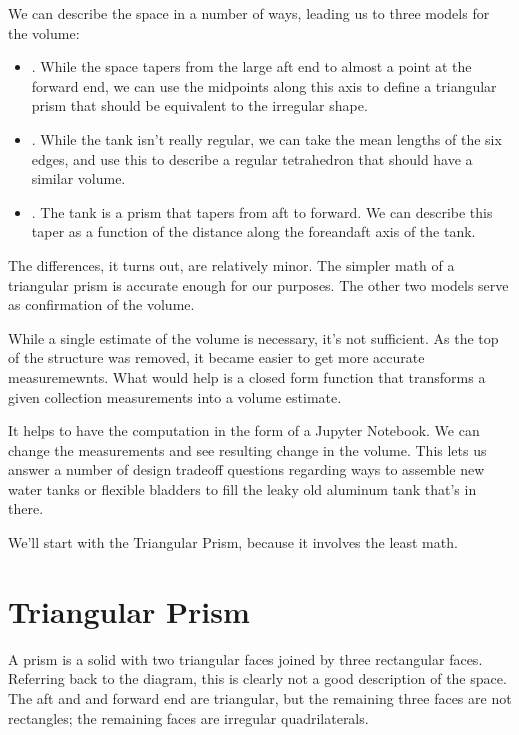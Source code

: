 \documentclass[letterpaper,10pt,english]{sphinxmanual}
\begin{document}
\sphinxAtStartPar
We can describe the space in a number of ways, leading us to three models for the volume:
\begin{itemize}
\item {} 
\sphinxAtStartPar
{}. While the space tapers from the large aft end to almost a point at the forward end,
we can use the midpoints along this axis to define
a triangular prism that should be equivalent to the irregular shape.

\item {} 
\sphinxAtStartPar
{}. While the tank isn’t really regular, we can take the mean lengths of the six edges,
and use this to describe a regular tetrahedron that should have a similar volume.

\item {} 
\sphinxAtStartPar
{}. The tank is a prism that tapers from aft to forward. We can describe this taper
as a function of the distance along the fore\sphinxhyphen{}and\sphinxhyphen{}aft axis of the tank.

\end{itemize}

\sphinxAtStartPar
The differences, it turns out, are relatively minor. The simpler math of a triangular prism
is accurate enough for our purposes. The other two models serve as confirmation of the volume.

\sphinxAtStartPar
While a single estimate of the volume is necessary, it’s not sufficient.
As the top of the structure was removed, it became easier to get more accurate measuremewnts.
What would help is a closed form function that transforms a given collection measurements
into a volume estimate.

\sphinxAtStartPar
It helps to have the computation in the form of a Jupyter Notebook.
We can change the measurements and see resulting change in the volume.
This lets us answer a number of design tradeoff questions regarding ways
to assemble new water tanks or flexible bladders to fill the leaky old aluminum tank that’s in there.

\sphinxAtStartPar
We’ll start with the Triangular Prism, because it involves the least math.


\chapter{Triangular Prism}
\label{\detokenize{prism:triangular-prism}}\label{\detokenize{prism::doc}}
\sphinxAtStartPar
A prism is a solid with two triangular faces joined by three rectangular faces. Referring back to the diagram, this is clearly not a good description of the space. The aft and and forward end are triangular, but the remaining three faces are not rectangles; the remaining faces are irregular quadrilaterals.
\end{document}
